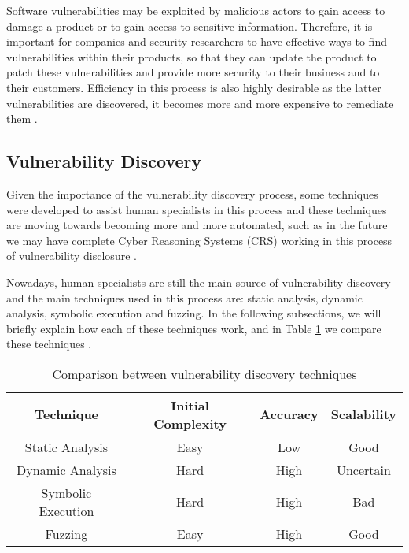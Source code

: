 Software vulnerabilities may be exploited by malicious actors to gain access to damage a product or to gain access to sensitive information. Therefore, it is important for companies and security researchers to have effective ways to find vulnerabilities within their products, so that they can update the product to patch these vulnerabilities and provide more security to their business and to their customers. Efficiency in this process is also highly desirable as the latter vulnerabilities are discovered, it becomes more and more expensive to remediate them \cite{soft-eng-economics}.

\subsection{Vulnerability Discovery}
\label{subsec:vuln-disc}

Given the importance of the vulnerability discovery process, some techniques were developed to assist human specialists in this process and these techniques are moving towards becoming more and more automated, such as in the future we may have complete Cyber Reasoning Systems (CRS) working in this process of vulnerability disclosure \cite{crs}.

Nowadays, human specialists are still the main source of vulnerability discovery and the main techniques used in this process are: static analysis, dynamic analysis, symbolic execution and fuzzing. In the following subsections, we will briefly explain how each of these techniques work, and in Table \ref{tab:disc-techniques} we compare these techniques \cite{fuzzing}.

\begin{table}[h]
    \centering
    \caption{Comparison between vulnerability discovery techniques}
        \begin{tabular}{|c|c|c|c|}
        \hline
        \textbf{Technique}   & \textbf{Initial Complexity} & \textbf{Accuracy} & \textbf{Scalability} \\ \hline
        Static Analysis    & Easy      & Low   & Good         \\ \hline
        Dynamic Analysis   & Hard      & High  & Uncertain    \\ \hline
        Symbolic Execution & Hard      & High  & Bad          \\ \hline
        Fuzzing            & Easy      & High  & Good         \\ \hline
        \end{tabular}%
    \label{tab:disc-techniques}
\end{table}

